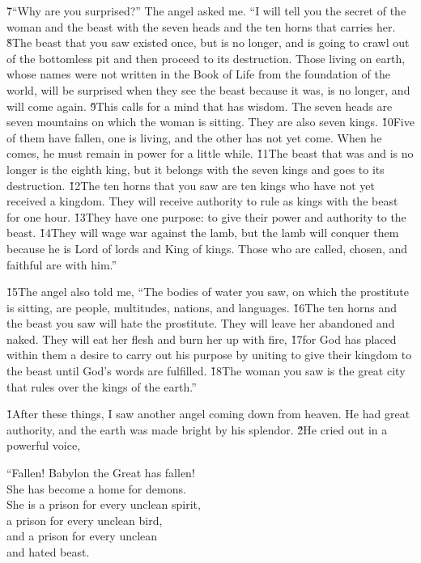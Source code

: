 \v{7}``Why are you surprised?'' The angel asked me. ``I will tell you the secret of the woman and the beast with the seven heads and the ten horns that carries her. \v{8}The beast that you saw existed once, but is no longer, and is going to crawl out of the bottomless pit and then proceed to its destruction. Those living on earth, whose names were not written in the Book of Life from the foundation of the world, will be surprised when they see the beast because it was, is no longer, and will come again. \v{9}This calls for a mind that has wisdom. The seven heads are seven mountains on which the woman is sitting. They are also seven kings. \v{10}Five of them have fallen, one is living, and the other has not yet come. When he comes, he must remain in power for a little while. \v{11}The beast that was and is no longer is the eighth king, but it belongs with the seven kings and goes to its destruction. \v{12}The ten horns that you saw are ten kings who have not yet received a kingdom. They will receive authority to rule as kings with the beast for one hour. \v{13}They have one purpose: to give their power and authority to the beast. \v{14}They will wage war against the lamb, but the lamb will conquer them because he is Lord of lords and King of kings. Those who are called, chosen, and faithful are with him.''

\v{15}The angel also told me, ``The bodies of water you saw, on which the prostitute is sitting, are people, multitudes, nations, and languages. \v{16}The ten horns and the beast you saw will hate the prostitute. They will leave her abandoned and naked. They will eat her flesh and burn her up with fire, \v{17}for God has placed within them a desire to carry out his purpose by uniting to give their kingdom to the beast until God's words are fulfilled. \v{18}The woman you saw is the great city that rules over the kings of the earth.''

\v{1}After these things, I saw another angel coming down from heaven. He had great authority, and the earth was made bright by his splendor. \v{2}He cried out in a powerful voice,

\begin{poetry}
\poeml ``Fallen! Babylon the Great has fallen! \\
\poemll    She has become a home for demons. \\
\poeml She is a prison for every unclean spirit, \\
\poemll    a prison for every unclean bird, \\
\poemll    and a prison for every unclean \\
\poemlll       and hated beast.
\end{poetry}

